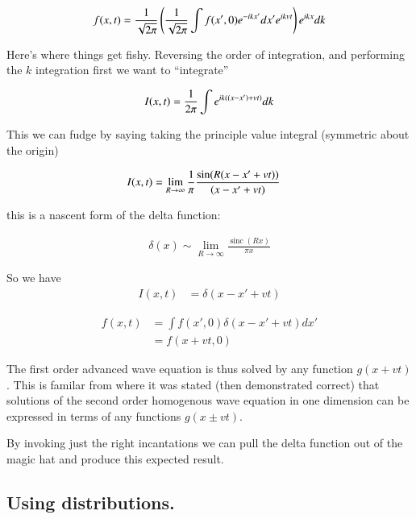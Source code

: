 \documentclass{article}
\DeclareMathOperator{\sinc}{sinc}
\begin{document}
\begin{align*}
{{f}}(x,t) = \frac{1}{\sqrt{2\pi}} \left( \frac{1}{\sqrt{2\pi}}\int f(x',0) e^{-i k x'} dx' e^{i k v t} \right) e^{ i k x } dk
\end{align*}

Here's where things get fishy.  Reversing the order of integration, and performing
the $k$ integration first we want to ``integrate''

\begin{align*}
I(x,t) = \frac{1}{2\pi} \int e^{ i k ((x-x') + v t) } dk
\end{align*}

This we can fudge by saying taking the principle value integral (symmetric about the origin)

\begin{align*}
I(x,t) &= \lim_{R \rightarrow \infty} \frac{1}{\pi} \frac{\sin( R (x-x' + v t) )}{ (x-x' + vt)}
\end{align*}

this is a nascent form of the delta function:

\begin{align*}
\delta(x) \sim \lim_{R \rightarrow \infty} \frac{\sinc( R x )}{\pi x}
\end{align*}

So we have
\begin{align*}
I(x,t) &= \delta(x - x' + v t) 
\end{align*}

\begin{align*}
{{f}}(x,t) 
&= \int f(x',0) \delta(x - x' + v t) dx' \\
&= f(x + v t,0) 
\end{align*}

The first order advanced wave equation is thus solved by any function $g(x + vt)$.  This
is familar from
\cite{french1971vaw} where it was stated (then demonstrated correct) that solutions of the second
order homogenous wave equation in one dimension can be expressed in terms of any functions
$g(x \pm vt)$.

By invoking just the right incantations we can pull the delta function out of the magic hat and 
produce this expected result.

\subsection{ Using distributions. }



\end{document}
